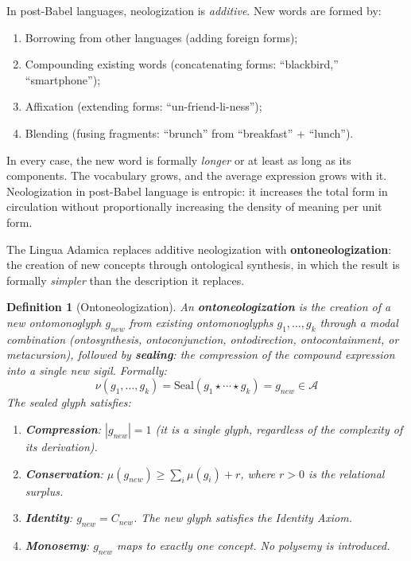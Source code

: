 \documentclass[12pt, letterpaper]{book}
\def\equiv{=}%
\def\mathfrak#1{#1}%
\newtheorem{definition}{Definition}[chapter]
\begin{document}
In post-Babel languages, neologization is \textit{additive}. New words are formed by:
\begin{enumerate}[label=(\roman*)]
    \item Borrowing from other languages (adding foreign forms);
    \item Compounding existing words (concatenating forms: ``blackbird,'' ``smartphone'');
    \item Affixation (extending forms: ``un-friend-li-ness'');
    \item Blending (fusing fragments: ``brunch'' from ``breakfast'' + ``lunch'').
\end{enumerate}
In every case, the new word is formally \textit{longer} or at least as long as its components. The vocabulary grows, and the average expression grows with it. Neologization in post-Babel language is entropic: it increases the total form in circulation without proportionally increasing the density of meaning per unit form.

The Lingua Adamica replaces additive neologization with \textbf{ontoneologization}: the creation of new concepts through ontological synthesis, in which the result is formally \textit{simpler} than the description it replaces.

\begin{definition}[Ontoneologization]\label{def:ontoneologization}
An \textbf{ontoneologization} is the creation of a new ontomonoglyph $\mathfrak{g}_{new}$ from existing ontomonoglyphs $\mathfrak{g}_1, \ldots, \mathfrak{g}_k$ through a modal combination (ontosynthesis, ontoconjunction, ontodirection, ontocontainment, or metacursion), followed by \textbf{sealing}: the compression of the compound expression into a single new sigil. Formally:
\[
\nu(\mathfrak{g}_1, \ldots, \mathfrak{g}_k) \equiv \mathrm{Seal}(\mathfrak{g}_1 \star \cdots \star \mathfrak{g}_k) \equiv \mathfrak{g}_{new} \in \mathcal{A}
\]
The sealed glyph satisfies:
\begin{enumerate}[label=(\roman*)]
    \item \textbf{Compression}: $|\mathfrak{g}_{new}| \equiv 1$ (it is a single glyph, regardless of the complexity of its derivation).
    \item \textbf{Conservation}: $\mu(\mathfrak{g}_{new}) \geq \sum_i \mu(\mathfrak{g}_i) + r$, where $r > 0$ is the relational surplus.
    \item \textbf{Identity}: $\mathfrak{g}_{new} \equiv C_{new}$. The new glyph satisfies the Identity Axiom.
    \item \textbf{Monosemy}: $\mathfrak{g}_{new}$ maps to exactly one concept. No polysemy is introduced.
\end{enumerate}
\end{definition}
\end{document}
